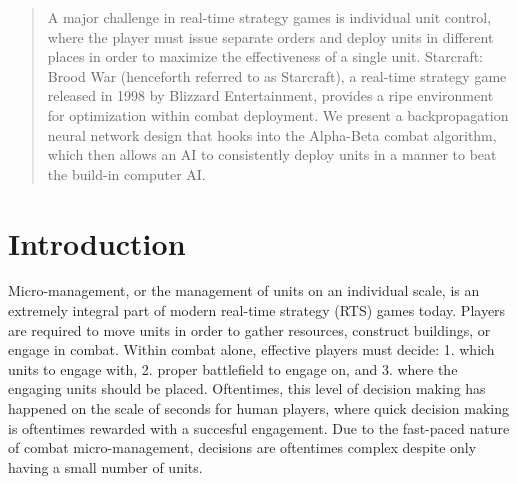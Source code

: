\documentclass[twocolumn]{article}
\begin{document}

\begin{abstract}
A major challenge in real-time strategy games is individual unit control, where the player must issue separate orders and deploy units in different places in order to maximize the effectiveness of a single unit. Starcraft: Brood War (henceforth referred to as Starcraft), a real-time strategy game released in 1998 by Blizzard Entertainment, provides a ripe environment for optimization within combat deployment. We present a backpropagation neural network design that hooks into the Alpha-Beta combat algorithm, which then allows an AI to consistently deploy units in a manner to beat the build-in computer AI. 
\end{abstract}

\section{Introduction}
Micro-management, or the management of units on an individual scale, is an extremely integral part of modern real-time strategy (RTS) games today. Players are required to move units in order to gather resources, construct buildings, or engage in combat. Within combat alone, effective players must decide: 1. which units to engage with, 2. proper battlefield to engage on, and 3. where the engaging units should be placed. Oftentimes, this level of decision making has happened on the scale of seconds for human players, where quick decision making is oftentimes rewarded with a succesful engagement. Due to the fast-paced nature of combat micro-management, decisions are oftentimes complex despite only having a small number of units. 
\end{document}
